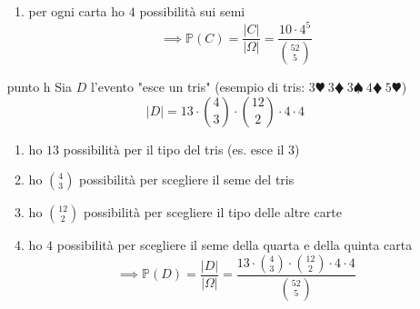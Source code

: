 \begin{enumerate}
\begin{enumerate}
\item per ogni carta ho $4$ possibilità sui semi\begin{equation*}
\mathbb{\implies P}( C) =\frac{| C| }{| \Omega | } =\frac{10\cdot 4^{5}}{\binom{52}{5}}
\end{equation*}
\end{enumerate}
\item [punto h] Sia $D$ l'evento "esce un tris" (esempio di tris: $3\varheartsuit \ 3\vardiamondsuit \ 3\spadesuit \ 4\vardiamondsuit \ 5\varheartsuit $)\begin{equation*}
| D| =13\cdot \binom{4}{3} \cdot \binom{12}{2} \cdot 4\cdot 4
\end{equation*}
\begin{enumerate}
\item ho $13$ possibilità per il tipo del tris (es. esce il $3$)
\item ho $\binom{4}{3}$ possibilità per scegliere il seme del tris
\item ho $\binom{12}{2}$ possibilità per scegliere il tipo delle altre carte
\item ho $4$ possibilità per scegliere il seme della quarta e della quinta carta\begin{equation*}
\mathbb{\implies P}( D) =\frac{| D| }{| \Omega | } =\frac{13\cdot \binom{4}{3} \cdot \binom{12}{2} \cdot 4\cdot 4}{\binom{52}{5}}
\end{equation*}
\end{enumerate}
\end{enumerate}

